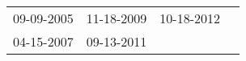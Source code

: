 \begin{supertabular}{llll}
 09-09-2005 &  11-18-2009 &  10-18-2012 \\
 04-15-2007 &  09-13-2011 &             \\
\end{supertabular}
